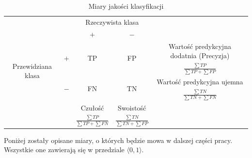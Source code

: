 \begin{table}[htbp]
\caption{Miary jakości klasyfikacji}
	\begin{tabular}{cc|c|c|c}
	\cline{3-4}
	 &  & \multicolumn{ 2}{c|}{Rzeczywista klasa} &  \\ \cline{3-4}
	 &  & $ + $ & $ - $ &  \\ \hline
	\multicolumn{ 1}{|c|}{\multirow{4}{*}{Przewidziana klasa}} & \multicolumn{ 1}{c|}{\multirow{2}{*}{$ + $}} & \multicolumn{ 1}{c|}{\multirow{2}{*}{TP}} & \multicolumn{ 1}{c|}{\multirow{2}{*}{FP}} &  \multicolumn{ 1}{c|}{Wartość predykcyjna dodatnia (Precyzja)} \\
	\multicolumn{ 1}{|c|}{} & \multicolumn{ 1}{c|}{} & \multicolumn{ 1}{c|}{} & \multicolumn{ 1}{c|}{} & \multicolumn{ 1}{c|}{$ \frac{\sum TP}{\sum TP + \sum FP} $ } \\ \cline{ 2- 5}
	\multicolumn{ 1}{|c|}{} & \multicolumn{ 1}{c|}{\multirow{2}{*}{$-$}} & \multicolumn{ 1}{c|}{\multirow{2}{*}{FN}} & \multicolumn{ 1}{c|}{\multirow{2}{*}{TN}} & \multicolumn{ 1}{c|}{Wartość predykcyjna ujemna}  \\ 
	\multicolumn{ 1}{|c|}{} & \multicolumn{ 1}{c|}{} & \multicolumn{ 1}{c|}{} & \multicolumn{ 1}{c|}{} & \multicolumn{ 1}{c|}{ $ \frac{\sum TN}{\sum TN + \sum FN} $ }\\ \hline
	 &  & Czułość  & Swoistość &  \\
	\multicolumn{1}{l}{} & \multicolumn{1}{l}{} & \multicolumn{1}{|l|}{$ \frac{\sum TP}{\sum TP + \sum FN} $ } & \multicolumn{1}{l|}{$ \frac{\sum TN}{\sum TN + \sum FP} $ } & \multicolumn{1}{l}{} \\ \cline{3-4}
	\end{tabular}
\label{tab:TPFN}
\end{table}


	
	 Poniżej zostały opisane miary, o których będzie mowa w dalszej części pracy. Wszystkie one zawierają się w przedziale $ \langle 0,1 \rangle $.

